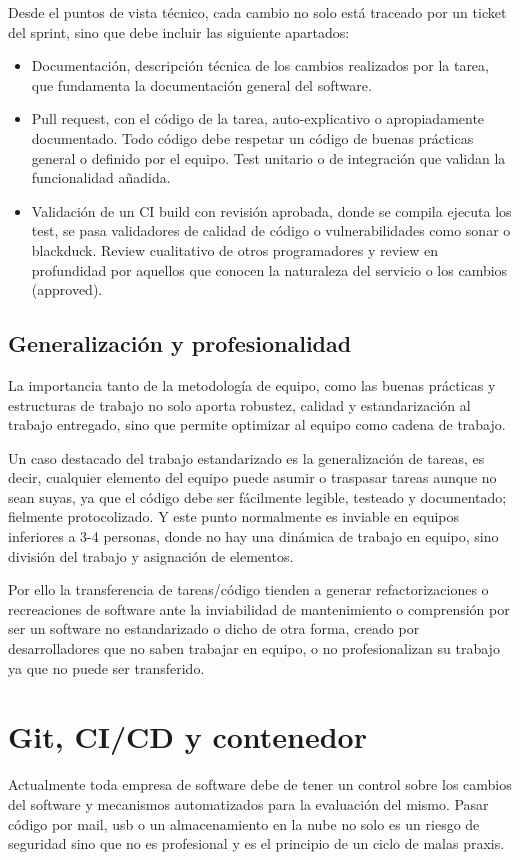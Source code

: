 Desde el puntos de vista técnico, cada cambio no solo está traceado por un ticket del sprint, sino que debe incluir las siguiente apartados:
\begin{itemize}
    \item Documentación, descripción técnica de los cambios realizados por la tarea, que fundamenta la documentación general del software.
    \item Pull request, con el código de la tarea, auto-explicativo o apropiadamente documentado. Todo código debe respetar un código de buenas prácticas general o definido por el equipo. Test unitario o de integración que validan la funcionalidad añadida.
    \item Validación de un CI build con revisión aprobada, donde se compila ejecuta los test, se pasa validadores de calidad de código o vulnerabilidades como sonar\cite{c_sonar} o blackduck\cite{c_blackduck}. Review cualitativo de otros programadores y review en profundidad por aquellos que conocen la naturaleza del servicio o los cambios (approved).
\end{itemize}

\subsection{Generalización y profesionalidad}
La importancia tanto de la metodología de equipo, como las buenas prácticas y estructuras de trabajo no solo aporta robustez, calidad y estandarización al trabajo entregado, sino que permite optimizar al equipo como cadena de trabajo.

 Un caso destacado del trabajo estandarizado es la generalización de tareas, es decir, cualquier elemento del equipo puede asumir o traspasar tareas aunque no sean suyas, ya que el código debe ser fácilmente legible, testeado y documentado; fielmente protocolizado. Y este punto normalmente es inviable en equipos inferiores a 3-4 personas, donde no hay una dinámica de trabajo en equipo, sino división del trabajo y asignación de elementos.

Por ello la transferencia de tareas/código tienden a generar refactorizaciones o recreaciones de software ante la inviabilidad de mantenimiento o comprensión por ser un software no estandarizado o dicho de otra forma, creado por desarrolladores que no saben trabajar en equipo, o no profesionalizan su trabajo ya que no puede ser transferido.

\section{Git, CI/CD y contenedor}
Actualmente toda empresa de software debe de tener un control sobre los cambios del software y mecanismos automatizados para la evaluación del mismo. Pasar código por mail, usb o un almacenamiento en la nube no solo es un riesgo de seguridad sino que no es profesional y es el principio de un ciclo de malas praxis.

